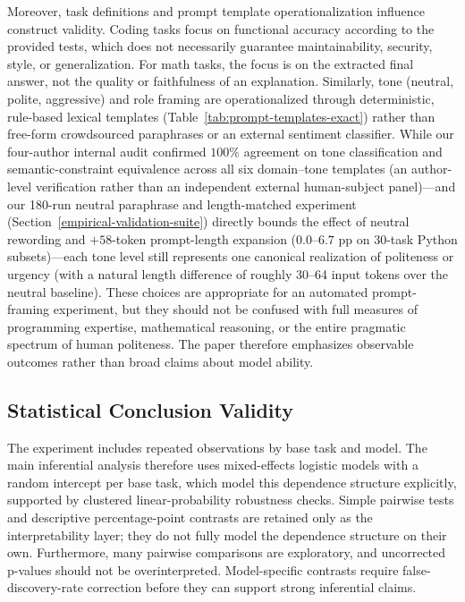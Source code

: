 \documentclass[a4paper,fleqn]{cas-sc}
\begin{document}
Moreover, task definitions and prompt template operationalization influence construct validity. Coding tasks focus on functional accuracy according to the provided tests, which does not necessarily guarantee maintainability, security, style, or generalization. For math tasks, the focus is on the extracted final answer, not the quality or faithfulness of an explanation. Similarly, tone (neutral, polite, aggressive) and role framing are operationalized through deterministic, rule-based lexical templates (Table~\ref{tab:prompt-templates-exact}) rather than free-form crowdsourced paraphrases or an external sentiment classifier. While our four-author internal audit confirmed $100\%$ agreement on tone classification and semantic-constraint equivalence across all six domain--tone templates (an author-level verification rather than an independent external human-subject panel)—and our 180-run neutral paraphrase and length-matched experiment (Section~\ref{empirical-validation-suite}) directly bounds the effect of neutral rewording and $+58$-token prompt-length expansion ($0.0$--$6.7$ pp on 30-task Python subsets)—each tone level still represents one canonical realization of politeness or urgency (with a natural length difference of roughly 30--64 input tokens over the neutral baseline). These choices are appropriate for an automated prompt-framing experiment, but they should not be confused with full measures of programming expertise, mathematical reasoning, or the entire pragmatic spectrum of human politeness. The paper therefore emphasizes observable outcomes rather than broad claims about model ability.

\subsection{Statistical Conclusion Validity}\label{statistical-conclusion-validity}

The experiment includes repeated observations by base task and model. The main inferential analysis therefore uses mixed-effects logistic models with a random intercept per base task, which model this dependence structure explicitly, supported by clustered linear-probability robustness checks. Simple pairwise tests and descriptive percentage-point contrasts are retained only as the interpretability layer; they do not fully model the dependence structure on their own. Furthermore, many pairwise comparisons are exploratory, and uncorrected p-values should not be overinterpreted. Model-specific contrasts require false-discovery-rate correction before they can support strong inferential claims.
\end{document}

